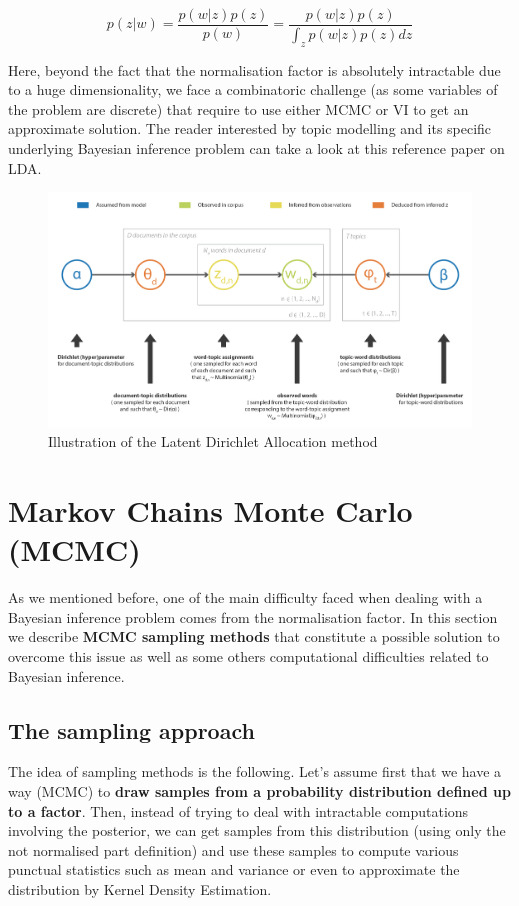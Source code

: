 \begin{equation}p(z | w)=\frac{p(w | z) p(z)}{p(w)}=\frac{p(w | z) p(z)}{\int_{z} p(w | z) p(z) d z}\end{equation}

Here, beyond the fact that the normalisation factor is absolutely intractable due to a huge dimensionality, we face a combinatoric challenge (as some variables of the problem are discrete) that require to use either MCMC or VI to get an approximate solution. The reader interested by topic modelling and its specific underlying Bayesian inference problem can take a look at this reference paper \cite{Blei2003a}  on LDA.


\begin{figure}[h]
    \centering
\includegraphics[width=\textwidth]{pic/p05c08-snip02.png}
    \caption{Illustration of the Latent Dirichlet Allocation method}
    \label{fig:p05c08-snip02}
\end{figure}


\section{Markov Chains Monte Carlo (MCMC)}

As we mentioned before, one of the main difficulty faced when dealing with a Bayesian inference problem comes from the normalisation factor. In this section we describe \textbf{MCMC sampling methods} that constitute a possible solution to overcome this issue as well as some others computational difficulties related to Bayesian inference.

\subsection{The sampling approach}

The idea of sampling methods is the following. Let's assume first that we have a way (MCMC) to \textbf{draw samples from a probability distribution defined up to a factor}. Then, instead of trying to deal with intractable computations involving the posterior, we can get samples from this distribution (using only the not normalised part definition) and use these samples to compute various punctual statistics such as mean and variance or even to approximate the distribution by Kernel Density Estimation.

